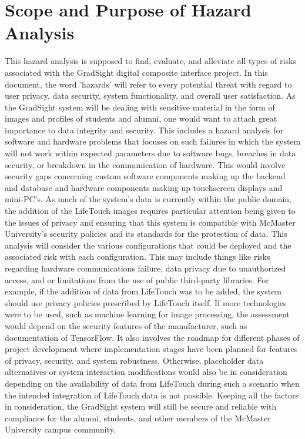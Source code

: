 \documentclass{article}
\begin{document}
\section{Scope and Purpose of Hazard Analysis}

This hazard analysis is supposed to find, evaluate, and alleviate all types of risks associated with the GradSight digital composite interface project. In this document, the word 'hazards' will refer to every potential threat with regard to user privacy, data security, system functionality, and overall user satisfaction. As the GradSight system will be dealing with sensitive material in the form of
images and profiles of students and alumni, one would want to attach great importance to data
integrity and security. This includes a hazard analysis for software and hardware problems that
focuses on such failures in which the system will not work within expected parameters due to
software bugs, breaches in data security, or breakdown in the communication of hardware.
\newline
\newline
This would involve security gaps concerning custom software components making up the backend
and database and hardware components making up touchscreen displays and mini-PC's. As much
of the system's data is currently within the public domain, the addition of the LifeTouch images
requires particular attention being given to the issues of privacy and ensuring that this system is
compatible with McMaster University's security policies and its standards for the protection of
data.
\newline
\newline
This analysis will consider the various configurations that could be deployed and the associated
risk with each configuration. This may include things like risks regarding hardware communications
failure, data privacy due to unauthorized access, and or limitations from the use of public
third-party libraries. For example, if the addition of data from LifeTouch was to be added, the
system should use privacy policies prescribed by LifeTouch itself. If more technologies were to be
used, such as machine learning for image processing, the assessment would depend on the
security features of the manufacturer, such as documentation of TensorFlow.
\newline
\newline
It also involves the roadmap for different phases of project development where implementation
stages have been planned for features of privacy, security, and system robustness. Otherwise,
placeholder data alternatives or system interaction modifications would also be in consideration
depending on the availability of data from LifeTouch during such a scenario when the intended
integration of LifeTouch data is not possible. Keeping all the factors in consideration, the GradSight
system will still be secure and reliable with compliance for the alumni, students, and other
members of the McMaster University campus community.
\end{document}
